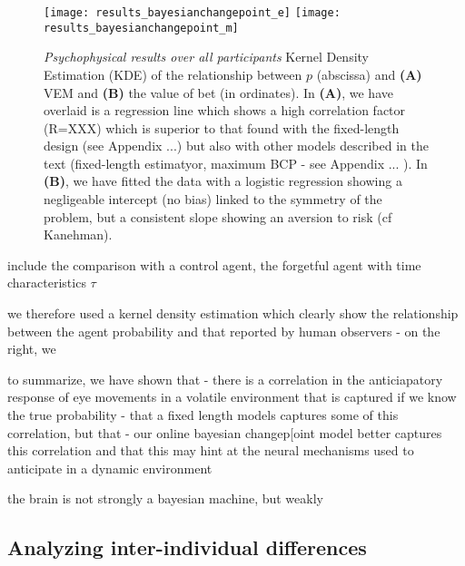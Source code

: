 \documentclass[profile,final,english, draft]{article}%
\begin{document}
\begin{figure}%
\begin{center} 
    \texttt{[image: results\_bayesianchangepoint\_e]}
    \texttt{[image: results\_bayesianchangepoint\_m]}
\end{center}
\caption{\emph{Psychophysical results over all participants} 
Kernel Density Estimation (KDE) of the relationship between $p$ (abscissa) and \textbf{(A)} VEM and \textbf{(B)} the value of bet (in ordinates). In \textbf{(A)}, we have overlaid is a regression line which shows a high correlation factor (R=XXX) which is superior to that found with the fixed-length design (see Appendix ...) but also with other models described in the text (fixed-length estimatyor, maximum BCP - see Appendix ... ). In \textbf{(B)}, we have fitted the data with a logistic regression showing a negligeable intercept (no bias) linked to the symmetry of the problem, but a consistent slope showing an aversion to risk (cf Kanehman).
}
\label{fig:results_psycho}
\end{figure}

include the comparison with a control agent, the forgetful agent with time characteristics $\tau$


we therefore used a kernel density estimation which clearly show the relationship between the agent probability and that reported by human observers
- on the right, we

to summarize, we have shown that
- there is a correlation in the anticiapatory response of eye movements in a volatile environment that is captured if we know the true probability
- that a fixed length models captures some of this correlation, but that
- our online bayesian changep[oint model better captures this correlation and that this may hint at the neural mechanisms used to anticipate in a dynamic environment

the brain is not strongly a bayesian machine, but weakly



\subsection{Analyzing inter-individual differences}
\end{document}
